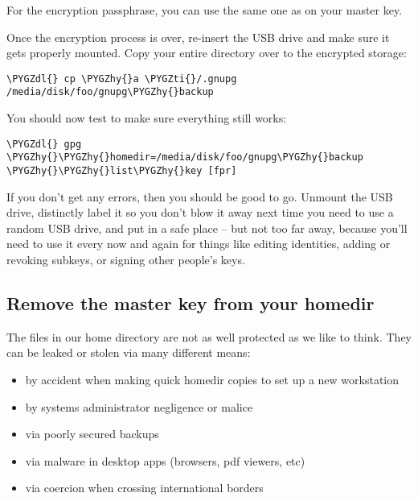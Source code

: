 \documentclass[a4paper,8pt,english]{sphinxmanual}
\def\PYGZdl{\char`\$}
\def\PYGZhy{\char`\-}
\def\PYGZti{\char`\~}
\begin{document}
For the encryption passphrase, you can use the same one as on your
master key.

Once the encryption process is over, re-insert the USB drive and make
sure it gets properly mounted. Copy your entire  directory
over to the encrypted storage:

\begin{Verbatim}[commandchars=\\\{\}]
\PYGZdl{} cp \PYGZhy{}a \PYGZti{}/.gnupg /media/disk/foo/gnupg\PYGZhy{}backup
\end{Verbatim}

You should now test to make sure everything still works:

\begin{Verbatim}[commandchars=\\\{\}]
\PYGZdl{} gpg \PYGZhy{}\PYGZhy{}homedir=/media/disk/foo/gnupg\PYGZhy{}backup \PYGZhy{}\PYGZhy{}list\PYGZhy{}key [fpr]
\end{Verbatim}

If you don't get any errors, then you should be good to go. Unmount the
USB drive, distinctly label it so you don't blow it away next time you
need to use a random USB drive, and put in a safe place -- but not too
far away, because you'll need to use it every now and again for things
like editing identities, adding or revoking subkeys, or signing other
people's keys.


\subsection{Remove the master key from  your homedir}
\label{process/maintainer-pgp-guide:remove-the-master-key-from-your-homedir}
The files in our home directory are not as well protected as we like to
think.  They can be leaked or stolen via many different means:
\begin{itemize}
\item {} 
by accident when making quick homedir copies to set up a new workstation

\item {} 
by systems administrator negligence or malice

\item {} 
via poorly secured backups

\item {} 
via malware in desktop apps (browsers, pdf viewers, etc)

\item {} 
via coercion when crossing international borders

\end{itemize}
\end{document}
